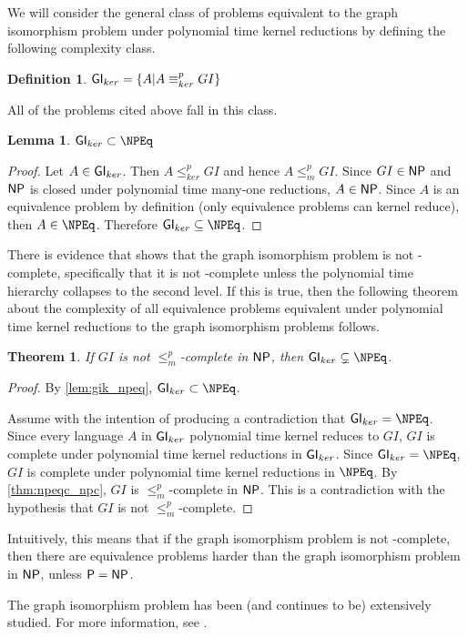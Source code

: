 \documentclass{article}
\newtheorem{theorem}{Theorem}[section]
\newtheorem{lemma}[lemma]{Lemma}
\theoremstyle{definition} \newtheorem{definition}[definition]{Definition}
\newcommand{\kr}{\leq^{p}_{ker}} %
\newcommand{\kequiv}{\equiv^{p}_{ker}} %
\newcommand{\mor}{\leq^{p}_{m}} %
\begin{document}
We will consider the general class of problems equivalent to the graph
isomorphism problem under polynomial time kernel reductions by defining the
following complexity class.

\begin{definition}
  $\GIk=\{A|A\kequiv GI\}$
\end{definition}

All of the problems cited above fall in this class.

\begin{lemma}\label{lem:gik_npeq}
  $\GIk\subset\NPEq$
\end{lemma}
\begin{proof}
  Let $A\in{\ensuremath{\mathsf{GI}}}_{ker}$. Then $A\kr GI$ and hence $A\mor GI$. Since $GI\in{\ensuremath{\mathsf{NP}}}$ and
  ${\mathsf{NP}}$ is closed under polynomial time many-one reductions, $A\in{\ensuremath{\mathsf{NP}}}$. Since
  $A$ is an equivalence problem by definition (only equivalence problems can
  kernel reduce), then $A\in\NPEq$. Therefore $\GIk\subseteq\NPEq$.
\end{proof}

There is evidence that shows that the graph isomorphism problem is not
\NP-complete, specifically that it is not \NP-complete unless the polynomial
time hierarchy collapses to the second level\cite{schoning87}. If this is true,
then the following theorem about the complexity of all equivalence problems
equivalent under polynomial time kernel reductions to the graph isomorphism
problems follows.

\begin{theorem}
  If $GI$ is not $\mor$-complete in ${\mathsf{NP}}$, then $\GIk\subsetneq\NPEq$.
\end{theorem}
\begin{proof}
  By \autoref{lem:gik_npeq}, $\GIk\subset\NPEq$.

  Assume with the intention of producing a contradiction that
  $\GIk=\NPEq$. Since every language $A$ in ${\mathsf{GI}}_{ker}$ polynomial time kernel
  reduces to $GI$, $GI$ is complete under polynomial time kernel reductions in
  ${\mathsf{GI}}_{ker}$. Since $\GIk=\NPEq$, $GI$ is complete under polynomial time kernel
  reductions in $\NPEq$. By \autoref{thm:npeqc_npc}, $GI$ is $\mor$-complete in
  ${\mathsf{NP}}$. This is a contradiction with the hypothesis that $GI$ is not
  $\mor$-complete.
\end{proof}
Intuitively, this means that if the graph isomorphism problem is not
\NP-complete, then there are equivalence problems harder than the graph
isomorphism problem in ${\mathsf{NP}}$, unless ${\mathsf{P}}={\mathsf{NP}}$.

The graph isomorphism problem has been (and continues to be) extensively
studied. For more information, see \cite{kst93}.
\end{document}

